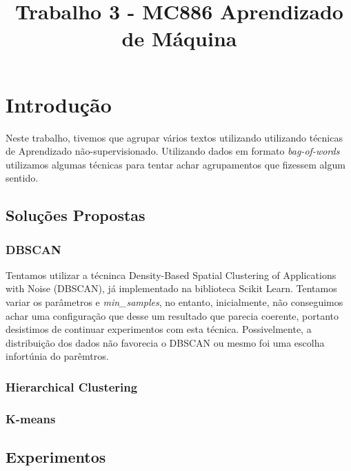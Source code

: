 \documentclass[conference]{IEEEtran}
\begin{document}
\title{Trabalho 3 - MC886 Aprendizado de Máquina}

\author{
\and
{}
}

\maketitle

\section{Introdução}

Neste trabalho, tivemos que agrupar vários textos utilizando utilizando técnicas de Aprendizado não-supervisionado. Utilizando dados em formato \textit{bag-of-words} utilizamos algumas técnicas para tentar achar agrupamentos que fizessem algum sentido.

\subsection{Soluções Propostas}

\subsubsection{DBSCAN}
Tentamos utilizar a técninca Density-Based Spatial Clustering of Applications with Noise (DBSCAN), já implementado na biblioteca Scikit Learn. Tentamos variar os parâmetros  e \textit{min\_samples}, no entanto, inicialmente, não conseguimos achar uma configuração que desse um resultado que parecia coerente, portanto desistimos de continuar experimentos com esta técnica. Possivelmente, a distribuição dos dados não favorecia o DBSCAN ou mesmo foi uma escolha infortúnia do parêmtros.

\subsubsection{Hierarchical Clustering}


\subsubsection{K-means}


\subsection{Experimentos}
\end{document}

